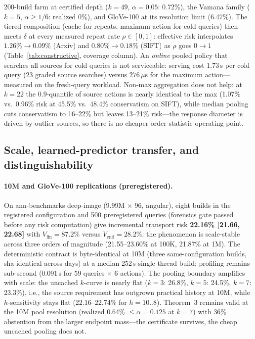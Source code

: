 \documentclass{article}
\begin{document}
200-build farm at certified depth ($k{=}49$, $\alpha{=}0.05$: 0.72\%), the Vamana family
($k{=}5$, $\alpha{\ge}1/6$: realized 0\%), and GloVe-100 at its resolution limit (6.47\%). The tiered composition (cache for repeats, maximum action for cold
queries) then meets $\delta$ at every measured repeat rate $\rho\in[0,1]$: effective risk interpolates
$1.26\%\to0.09\%$ (Arxiv) and $0.80\%\to0.18\%$ (SIFT) as $\rho$ goes $0\to1$ (Table~\ref{tab:constructive},
coverage column). An \emph{online} pooled policy that searches all sources for cold queries is not
serviceable: serving cost $1.73$\,s per cold query (23 graded source searches) versus $276\,\mu$s for the
maximum action---measured on the fresh-query workload. Non-max aggregation does not help: at $k{=}22$ the $0.9$-quantile of source
actions is nearly identical to the max (1.07\% vs.\ 0.96\% risk at 45.5\% vs.\ 48.4\% conservatism on
SIFT), while median pooling cuts conservatism to 16--22\% but leaves 13--21\% risk---the response
diameter is driven by outlier sources, so there is no cheaper order-statistic operating point.

\subsection{Scale, learned-predictor transfer, and distinguishability}
\label{sec:scale}

\paragraph{10M and GloVe-100 replications (preregistered).}
On ann-benchmarks deep-image (9.99M $\times$ 96, angular), eight builds in the registered
configuration and 500 preregistered queries (forensics gate passed before any risk
computation) give incremental transport risk \textbf{22.16\% [21.66, 22.68]} with
$V_{\mathrm{fin}}{=}87.2\%$ versus $V_{\mathrm{end}}{=}28.2\%$: the phenomenon is
scale-stable across three orders of magnitude (21.55--23.60\% at 100K, 21.87\% at 1M).
The deterministic contract is byte-identical at 10M (three same-configuration builds,
sha-identical across days) at a median 252\,s single-thread build; profiling remains
sub-second (0.091\,s for 59 queries $\times$ 6 actions). The pooling boundary amplifies
with scale: the uncached $k$-curve is nearly flat ($k{=}3$: 26.8\%, $k{=}5$: 24.5\%, $k{=}7$:
23.3\%), i.e., the source requirement has outgrown practical history at 10M, while
$h$-sensitivity stays flat (22.16--22.74\% for $h{=}10{..}8$). Theorem~3 remains valid at the 10M
pool resolution (realized 0.64\% $\le\alpha{=}0.125$ at $k{=}7$) with 36\% abstention from the
larger endpoint mass---the certificate survives, the cheap uncached pooling does not.
\end{document}
